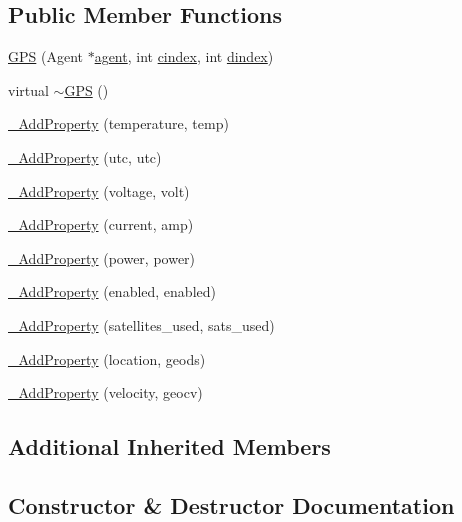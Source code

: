 \subsection*{Public Member Functions}
\begin{DoxyCompactItemize}
\item 
\hyperlink{classcubesat_1_1GPS_a033475ed836181ce17e2280a0ac6c78a}{G\+PS} (Agent $\ast$\hyperlink{classcubesat_1_1Device_a8499108eccaf7375bea8ead0182391a6}{agent}, int \hyperlink{classcubesat_1_1Device_a1deca725b01f8ef37e49662da6db4e53}{cindex}, int \hyperlink{classcubesat_1_1Device_a8a2b3d6d7400e6796c31705058172982}{dindex})
\item 
virtual \hyperlink{classcubesat_1_1GPS_a85ee6eba278200dddd5587c4cf2944fd}{$\sim$\+G\+PS} ()
\item 
\hyperlink{classcubesat_1_1GPS_ad360460187cc59936dd5b3be9e910cf3}{\+\_\+\+Add\+Property} (temperature, temp)
\item 
\hyperlink{classcubesat_1_1GPS_a0e85bdda2dc5cfcd0d637743ee8c9d0a}{\+\_\+\+Add\+Property} (utc, utc)
\item 
\hyperlink{classcubesat_1_1GPS_ac76d9e1915875a65690dffde32ef8618}{\+\_\+\+Add\+Property} (voltage, volt)
\item 
\hyperlink{classcubesat_1_1GPS_a55cc7f5abbd30fb9d1411718eb31b5a0}{\+\_\+\+Add\+Property} (current, amp)
\item 
\hyperlink{classcubesat_1_1GPS_a56c7d2ec1d4d8d93349d7a39b0de0346}{\+\_\+\+Add\+Property} (power, power)
\item 
\hyperlink{classcubesat_1_1GPS_afc908fc649610221f240f583baf18e7d}{\+\_\+\+Add\+Property} (enabled, enabled)
\item 
\hyperlink{classcubesat_1_1GPS_a525f1fcbadb25e45fe71ea5ac8ec5dd9}{\+\_\+\+Add\+Property} (satellites\+\_\+used, sats\+\_\+used)
\item 
\hyperlink{classcubesat_1_1GPS_a66df85c7601286f73b82d561b0755686}{\+\_\+\+Add\+Property} (location, geods)
\item 
\hyperlink{classcubesat_1_1GPS_a0e881f5aa0f080d69da97a0b03b35c5d}{\+\_\+\+Add\+Property} (velocity, geocv)
\end{DoxyCompactItemize}
\subsection*{Additional Inherited Members}


\subsection{Constructor \& Destructor Documentation}
\mbox{\label{classcubesat_1_1GPS_a033475ed836181ce17e2280a0ac6c78a}} 
